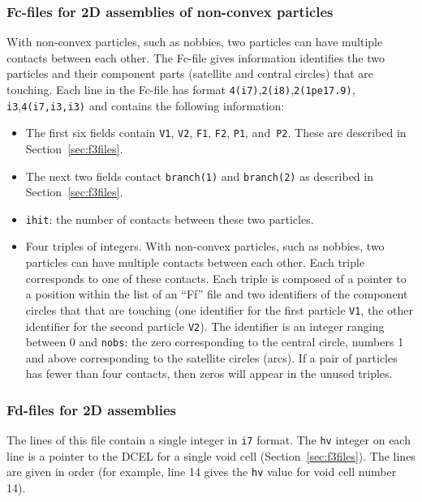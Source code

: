 \documentclass[letterpaper,11pt]{article}
\begin{document}
\subsubsection{Fc-files for 2D assemblies of non-convex particles}\label{sec:f3files2}
With non-convex particles, such as nobbies,
two particles can have multiple contacts between each other.
The Fc-file gives information identifies the two particles and their
component parts (satellite and central circles) that are touching.
Each line in the Fc-file has format
\texttt{4(i7)},\texttt{2(i8)},\texttt{2(1pe17.9)},
\texttt{i3},\texttt{4(i7,i3,i3)}
and contains the following information:
\begin{itemize}
\item
The first six fields contain \texttt{V1}, \texttt{V2}, \texttt{F1}, \texttt{F2}, \texttt{P1},
and~\texttt{P2}.
These are described in Section~\ref{sec:f3files}.
\item
The next two fields contact \texttt{branch(1)} and \texttt{branch(2)}
as described in Section~\ref{sec:f3files}.
\item
\texttt{ihit}: the number of contacts between these two particles.
\item
Four triples of integers.  With non-convex particles, such as nobbies,
two particles can have multiple contacts between each other.
Each triple corresponds to one of these contacts.
Each triple is composed of a pointer to
a position within the list of an ``Ff'' file and two identifiers
of the component circles that that are touching (one identifier for
the first particle \texttt{V1}, the other identifier for the
second particle \texttt{V2}).
The identifier is an integer ranging between 0 and \texttt{nobs}:
the zero corresponding to the central circle, numbers 1 and above
corresponding to the satellite circles (arcs).
If a pair of particles has fewer than four contacts, then
zeros will appear in the unused triples.
\end{itemize}
%
\subsubsection{Fd-files for 2D assemblies}\label{sec:f4files}
The lines of this file contain a single integer
in \texttt{i7} format.  The \texttt{hv} integer on 
each line is a pointer to the DCEL for a single void cell
(Section~\ref{sec:f3files}).
The lines are given in order (for example,
line 14 gives the \texttt{hv} value for void cell number 14).
%
\end{document}
